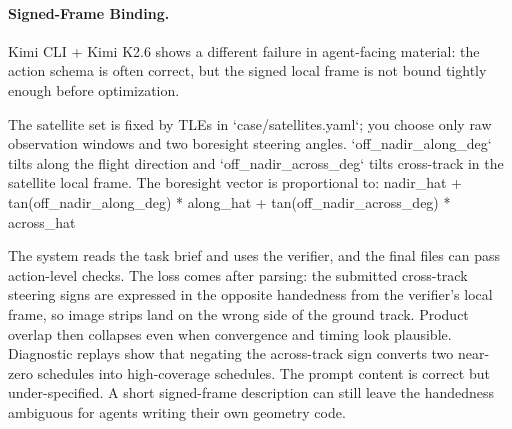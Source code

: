 \documentclass[]{mosi}
\newenvironment{promptblock}
  {\VerbatimEnvironment\par\smallskip\Needspace{10\baselineskip}\noindent\begin{promptblockinner}}
  {\end{promptblockinner}\par\smallskip}
\begin{document}
\paragraph{Signed-Frame Binding.} Kimi CLI + Kimi K2.6 shows a different failure in agent-facing material: the action schema is often correct, but the signed local frame is not bound tightly enough before optimization.
\begin{promptblock}
The satellite set is fixed by TLEs in `case/satellites.yaml`; you choose only
raw observation windows and two boresight steering angles.
`off_nadir_along_deg` tilts along the flight direction and
`off_nadir_across_deg` tilts cross-track in the satellite local frame.
The boresight vector is proportional to:
nadir_hat
+ tan(off_nadir_along_deg) * along_hat
+ tan(off_nadir_across_deg) * across_hat
\end{promptblock}
The system reads the task brief and uses the verifier, and the final files can pass action-level checks. The loss comes after parsing: the submitted cross-track steering signs are expressed in the opposite handedness from the verifier's local frame, so image strips land on the wrong side of the ground track. Product overlap then collapses even when convergence and timing look plausible. Diagnostic replays show that negating the across-track sign converts two near-zero schedules into high-coverage schedules. The prompt content is correct but under-specified. A short signed-frame description can still leave the handedness ambiguous for agents writing their own geometry code.
\end{document}
